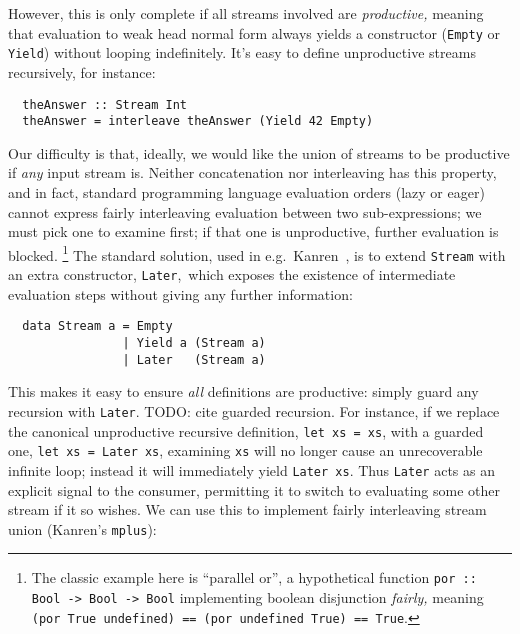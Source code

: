 \documentclass[acmsmall,screen,review,anonymous,dvipsnames]{acmart}
\newcommand\todo[1]{{\color{Orange}#1}}
\begin{document}
\noindent
However, this is only complete if all streams involved are \emph{productive,} meaning that evaluation to weak head normal form always yields a constructor (\texttt{Empty} or \texttt{Yield}) without looping indefinitely.
It's easy to define unproductive streams recursively, for instance:

\begin{verbatim}
  theAnswer :: Stream Int
  theAnswer = interleave theAnswer (Yield 42 Empty)
\end{verbatim}


\noindent
Our difficulty is that, ideally, we would like the union of streams to be productive if \emph{any} input stream is.
Neither concatenation nor interleaving has this property, and in fact, standard programming language evaluation orders (lazy or eager) cannot express fairly interleaving evaluation between two sub-expressions; we must pick one to examine first; if that one is unproductive, further evaluation is blocked.%
\footnote{The classic example here is ``parallel or'', a hypothetical function \texttt{por :: Bool -> Bool -> Bool} implementing boolean disjunction \emph{fairly,} meaning \texttt{(por True undefined) == (por undefined True) == True}.}
%
The standard solution, used in e.g.~\textmu{}Kanren~\citep{muKanren}, is to extend \texttt{Stream} with an extra constructor, \texttt{Later},\footnotemark\ which exposes the existence of intermediate evaluation steps without giving any further information:

\begin{verbatim}
  data Stream a = Empty
                | Yield a (Stream a)
                | Later   (Stream a)
\end{verbatim}

\noindent
This makes it easy to ensure \emph{all} definitions are productive: simply guard any recursion with \texttt{Later}.
\todo{TODO: cite guarded recursion.}
For instance, if we replace the canonical unproductive recursive definition, \texttt{let xs = xs}, with a guarded one, \texttt{let xs = Later xs}, examining \texttt{xs} will no longer cause an unrecoverable infinite loop; instead it will immediately yield \texttt{Later xs}.
Thus \texttt{Later} acts as an explicit signal to the consumer, permitting it to switch to evaluating some other stream if it so wishes.
We can use this to implement fairly interleaving stream union (\textmu{}Kanren's \texttt{mplus}):
\end{document}
